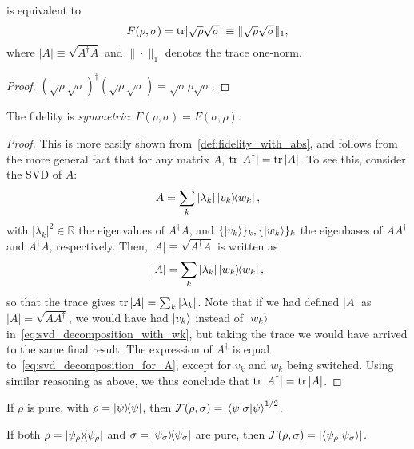 \documentclass[12pt]{report}
\newcommand{\RR}{\mathbb{R}}
\newcommand{\calF}{{\mathcal{F}}}
\begin{document}
\begin{prop}\label{def:fidelity_with_abs}
	 is equivalent to
	\begin{equation}
	F(\rho,\sigma)=\tr\lvert\sqrt\rho\sqrt\sigma\rvert
	\equiv \|\sqrt\rho\sqrt\sigma\|_1,	
	\end{equation}
	where $|A|\equiv\sqrt{A^\dagger A}$ and $\|\cdot\|_1$ denotes the trace one-norm.
\end{prop}
\begin{proof}
	$(\sqrt\rho\sqrt\sigma)^\dagger (\sqrt\rho\sqrt\sigma) = \sqrt\sigma\rho\sqrt\sigma$.
\end{proof}

\begin{prop}
	The fidelity is \emph{symmetric}: $F(\rho,\sigma)=F(\sigma,\rho)$.
\end{prop}
\begin{proof}
	This is more easily shown from~\cref{def:fidelity_with_abs}, and follows from the more general fact that for any matrix $A$, $\tr|A^\dagger|=\tr|A|$.
	To see this, consider the \ac{SVD} of $A$:
	\begin{equation}
		A = \sum_k |\lambda_k| \ketbra{v_k}{w_k},
		\label{eq:svd_decomposition_for_A}
	\end{equation}
	with $|\lambda_k|^2\in\RR$ the eigenvalues of $A^\dagger A$, and $\{\ket{v_k}\}_k,\{\ket{w_k}\}_k$ the eigenbases of $AA^\dagger$ and $A^\dagger A$, respectively.
	Then, $|A|\equiv\sqrt{A^\dagger A}$ is written as
	\begin{equation}
		|A| = \sum_k |\lambda_k| \ketbra{w_k}{w_k},
		\label{eq:svd_decomposition_with_wk}
	\end{equation}
	so that the trace gives $\tr|A| = \sum_k |\lambda_k|$.
	Note that if we had defined $|A|$ as $|A|=\sqrt{AA^\dagger}$, we would have had $\ket{v_k}$ instead of $\ket{w_k}$ in~\cref{eq:svd_decomposition_with_wk}, but taking the trace we would have arrived to the same final result.
	The expression of $A^\dagger$ is equal to~\cref{eq:svd_decomposition_for_A}, except for $v_k$ and $w_k$ being switched. Using similar reasoning as above, we thus conclude that $\tr|A^\dagger|=\tr|A|$.
\end{proof}

\begin{prop}
	If $\rho$ is pure, with $\rho=\ketbra\psi$, then
	$\calF(\rho,\sigma)=\mel{\psi}{\sigma}{\psi}^{1/2}$.
\end{prop}

\begin{prop}
	If both $\rho=\ketbra{\psi_\rho}$ and $\sigma=\ketbra{\psi_\sigma}$ are pure, then
	$\calF(\rho,\sigma)=\lvert\braket{\psi_\rho}{\psi_\sigma}\rvert$.
\end{prop}
\end{document}
